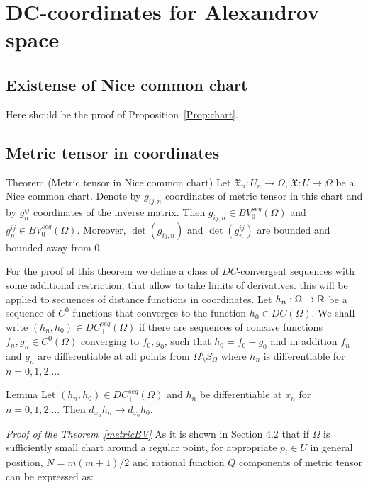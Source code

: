  
\section{DC-coordinates for Alexandrov space}

\subsection{Existense of Nice common chart}\label{NiceChartProof}
Here should be the proof of 
Proposition~\ref{Prop:chart}.
\subsection{Metric tensor  in coordinates}\label{sec:metr-con}

\begin{thm}{Theorem (Metric tensor in Nice common chart)}\label{metricBV}
Let
$\mathfrak X_n:U_n\to\Omega$,
$\mathfrak X:U\to\Omega$ be a Nice common chart.
Denote by $g_{ij,n}$ coordinates of metric tensor in this chart
and by $g^{ij}_n$ coordinates of the inverse matrix. 
Then
$g_{ij,n}\in BV_0^{seq}(\Omega)$
and
$g^{ij}_n\in BV_0^{seq}(\Omega)$.
Moreover, $\det(g_{ij,n})$ and $\det(g^{ij}_n)$ are bounded and bounded away from 0.

\end{thm}




For the proof of this theorem we define a class of $DC$-convergent sequences with some additional restriction,
that allow to take limits of derivatives.
 this will be applied to sequences of distance functions
in coordinates.
Let $h_n:\Omega\to\mathbb{R}$ be a sequence of $C^0$ functions that
converges to the function $h_0\in DC(\Omega)$.
We shall write
$(h_n, h_0)\in DC_+^{seq}(\Omega)$
if
there are sequences of concave functions $f_n,g_n\in C^0(\Omega)$ converging to
$f_0,g_0$, such that 
$h_0=f_0-g_0$ and in addition $f_n$ and $g_n$
are  differentiable at all points
from $\Omega\setminus S_\Omega$ where $h_n$ is
differentiable for $n=0,1,2\dots$.

 
 
\begin{thm}{Lemma}\label{DC+}
	Let
$(h_n, h_0)\in DC_+^{seq}(\Omega)$
and $h_n$ be
differentiable at
$x_n$ for $n=0,1,2\dots$.
Then $d_{x_n}h_n\to d_{x_0}h_0$. 


\end{thm}

{\it Proof of the Theorem~\ref{metricBV} }
As it is shown in \cite{PerDC} Section 4.2
that if $\Omega$ is sufficiently small chart around a regular point,
for appropriate $p_i\in U$ in general position, $N=m(m+1)/2$ and rational function $Q$ components of metric tensor can be expressed as:

